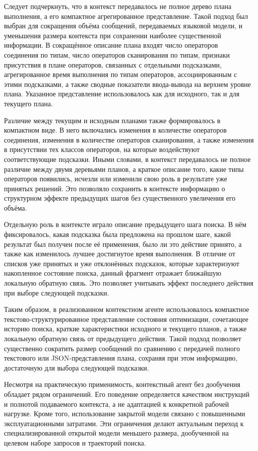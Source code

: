 Следует подчеркнуть, что в контекст передавалось не полное дерево плана выполнения, а его компактное агрегированное представление. Такой подход был выбран для сокращения объёма сообщений, передаваемых языковой модели, и уменьшения размера контекста при сохранении наиболее существенной информации. В сокращённое описание плана входят число операторов соединения по типам, число операторов сканирования по типам, признаки присутствия в плане операторов, связанных с отдельными подсказками, агрегированное время выполнения по типам операторов, ассоциированным с этими подсказками, а также сводные показатели ввода-вывода на верхнем уровне плана. Указанное представление использовалось как для исходного, так и для текущего плана.

Различие между текущим и исходным планами также формировалось в компактном виде. В него включались изменения в количестве операторов соединения, изменения в количестве операторов сканирования, а также изменения в присутствии тех классов операторов, на которые воздействуют соответствующие подсказки. Иными словами, в контекст передавалось не полное различие между двумя деревьями планов, а краткое описание того, какие типы операторов появились, исчезли или изменили свою роль в результате уже принятых решений. Это позволяло сохранить в контексте информацию о структурном эффекте предыдущих шагов без существенного увеличения его объёма.

Отдельную роль в контексте играло описание предыдущего шага поиска. В нём фиксировалось, какая подсказка была предложена на прошлом шаге, какой результат был получен после её применения, было ли это действие принято, а также как изменилось лучшее достигнутое время выполнения. В отличие от списков уже принятых и уже отклонённых подсказок, которые характеризуют накопленное состояние поиска, данный фрагмент отражает ближайшую локальную обратную связь. Это позволяет учитывать эффект последнего действия при выборе следующей подсказки.

Таким образом, в реализованном контекстном агенте использовалось компактное текстово-структурированное представление состояния оптимизации, сочетающее историю поиска, краткие характеристики исходного и текущего планов, а также локальную обратную связь от предыдущего действия. Такой подход позволяет существенно сократить размер сообщений по сравнению с передачей полного текстового или JSON-представления плана, сохраняя при этом информацию, достаточную для выбора следующей подсказки. 

Несмотря на практическую применимость, контекстный агент без дообучения обладает рядом ограничений. Его поведение определяется качеством инструкций и полнотой подаваемого контекста, а не адаптацией к конкретной рабочей нагрузке. Кроме того, использование закрытой модели связано с повышенными эксплуатационными затратами. Эти ограничения делают актуальным переход к специализированной открытой модели меньшего размера, дообученной на целевом наборе запросов и траекторий поиска.

